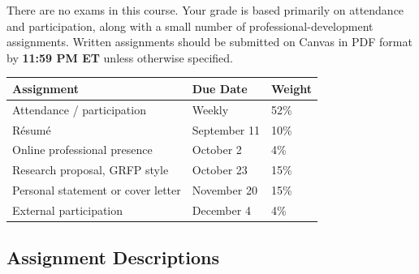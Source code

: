 \documentclass[11pt]{article}
\begin{document}
There are no exams in this course. Your grade is based primarily on attendance and participation, along with a small number of professional-development assignments. Written assignments should be submitted on Canvas in PDF format by \textbf{11:59 PM ET} unless otherwise specified.

\begin{center}
\renewcommand{\arraystretch}{1.15}
\begin{tabularx}{0.98\textwidth}{X p{} p{}}
\toprule
\textbf{Assignment} & \textbf{Due Date} & \textbf{Weight} \\
\midrule
Attendance / participation & Weekly & 52\% \\
R\'esum\'e & September 11 & 10\% \\
Online professional presence & October 2 & 4\% \\
Research proposal, GRFP style & October 23 & 15\% \\
Personal statement or cover letter & November 20 & 15\% \\
External participation & December 4 & 4\% \\
\bottomrule
\end{tabularx}
\renewcommand{\arraystretch}{1.0}
\end{center}

\subsection*{Assignment Descriptions}
\end{document}
